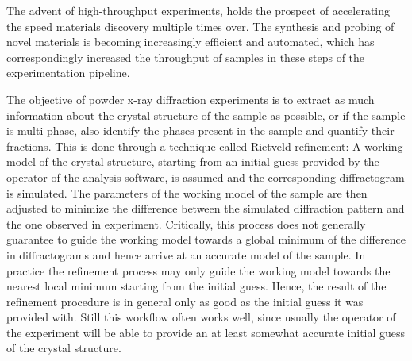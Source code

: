 








The advent of high-throughput experiments, holds the prospect of accelerating the speed materials discovery multiple times over.
The synthesis and probing of novel materials is becoming increasingly efficient and automated,
which has correspondingly increased the throughput of samples in these steps
of the experimentation pipeline.




The objective of powder x-ray diffraction experiments is to extract as much information about the crystal structure
of the sample as possible, or if the sample is multi-phase, also identify the phases present in the sample and quantify
their fractions.
This is done through a technique called Rietveld refinement: A working model of the crystal structure, starting
from an initial guess provided by the operator of the analysis software, is assumed and the corresponding diffractogram
is simulated.
The parameters of the working model of the sample are then adjusted to minimize the difference between the simulated
diffraction pattern and the one observed in experiment.
Critically, this process does not generally guarantee to guide the working model towards a global minimum of the difference
in diffractograms and hence arrive at an accurate model of the sample.
In practice the refinement process may only guide the working model towards the nearest local minimum
starting from the initial guess.
Hence, the result of the refinement procedure is in general only as good as the initial guess it was provided with.
Still this workflow often works well, since usually the operator of the experiment will be able
to provide an at least somewhat accurate initial guess of the crystal structure.

